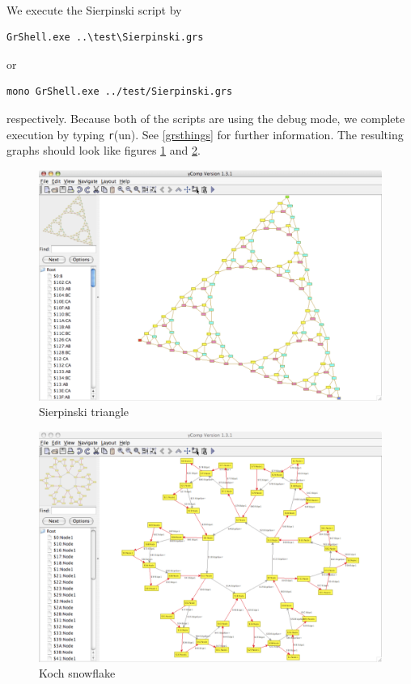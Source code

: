 \\
We execute the Sierpinski script by
\begin{verbatim}
GrShell.exe ..\test\Sierpinski.grs
\end{verbatim}
or
\begin{verbatim}
mono GrShell.exe ../test/Sierpinski.grs
\end{verbatim}
respectively. Because both of the scripts are using the debug mode, we complete execution by typing \texttt{r}(un). See \ref{grsthings} for further information. The resulting graphs should look like figures \ref{figsierp} and \ref{figsnowflake}.
\begin{figure}[htbp]
  \centering
  \includegraphics[width=\textwidth]{fig/sierpinski}
  \caption{Sierpinski triangle}
  \label{figsierp}
\end{figure}
\begin{figure}[htbp]
  \centering
  \includegraphics[width=\textwidth]{fig/snowflake}
  \caption{Koch snowflake}
  \label{figsnowflake}
\end{figure}
\vfill\pagebreak

